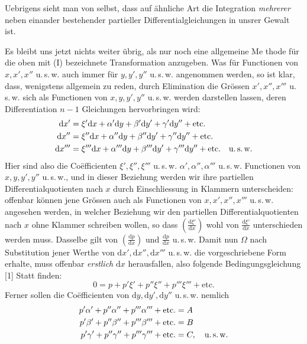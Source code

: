Uebrigens sieht man von selbst, dass auf ähnliche Art die Integration \emph{mehrerer} neben einander bestehender partieller Differentialgleichungen in unsrer Gewalt ist.

Es bleibt uns jetzt nichts weiter übrig, als nur noch eine allgemeine Me%
thode für die oben mit (I) bezeichnete Transformation anzugeben. Was für
Functionen von $x,x',x''$ u.\,s.\,w. auch immer für $y,y',y''$ u.\,s.\,w. angenommen
werden, so ist klar, dass, wenigstens allgemein zu reden, durch Elimination die
Grössen $x',x'',x'''$ u.\,s.\,w. sich als Functionen von $x,y,y',y''$ u.\,s.\,w. werden darstellen lassen, deren Differentiation $n-1$ Gleichungen hervorbringen wird:
\[
\begin{aligned}
\mathrm{d}x'&=\xi'\mathrm{d}x+\alpha'\mathrm{d}y+\beta'\mathrm{d}y'+\gamma'\mathrm{d}y''+\text{etc.}\\
\mathrm{d}x''&=\xi''\mathrm{d}x+\alpha''\mathrm{d}y+\beta''\mathrm{d}y'+\gamma''\mathrm{d}y''+\text{etc.}\\
\mathrm{d}x'''&=\xi'''\mathrm{d}x+\alpha'''\mathrm{d}y+\beta'''\mathrm{d}y'+\gamma'''\mathrm{d}y''+\text{etc.}\quad\text{u.\,s.\,w.}
\end{aligned}
\]
Hier sind also die Coëfficienten $\xi',\xi'',\xi'''$ u.\,s.\,w. $\alpha',\alpha'',\alpha'''$ u.\,s.\,w. Functionen von
$x,y,y',y''$ u.\,s.\,w., und in dieser Beziehung werden wir ihre partiellen Differentialquotienten nach $x$ durch Einschliessung in Klammern unterscheiden: offenbar können jene Grössen auch als Functionen von $x,x',x'',x'''$ u.\,s.\,w. angesehen
werden, in welcher Beziehung wir den partiellen Differentialquotienten nach $x$
ohne Klammer schreiben wollen, so dass $\left(\frac{\mathrm{d}\xi'}{\mathrm{d}x}\right)$ wohl von $\frac{\mathrm{d}\xi'}{\mathrm{d}x}$ unterschieden werden muss. Dasselbe gilt von $\left(\frac{\mathrm{d}p}{\mathrm{d}x}\right)$ und $\frac{\mathrm{d}p}{\mathrm{d}x}$ u.\,s.\,w. Damit nun $\Omega$ nach Substitution jener Werthe von $\mathrm{d}x',\mathrm{d}x'',\mathrm{d}x'''$ u.\,s.\,w. die vorgeschriebene Form erhalte,
muss offenbar \emph{erstlich} $\mathrm{d}x$ herausfallen, also folgende Bedingungsgleichung [1]
Statt finden:
\[
0=p+p'\xi'+p''\xi''+p'''\xi'''+\text{etc.}
\]
Ferner sollen die Coëfficienten von $\mathrm{d}y,\mathrm{d}y',\mathrm{d}y''$ u.\,s.\,w. nemlich
\[
\begin{aligned}
p'\alpha'+p''\alpha''+p'''\alpha'''+\text{etc.}&=A\\
p'\beta'+p''\beta''+p'''\beta'''+\text{etc.}&=B\\
p'\gamma'+p''\gamma''+p'''\gamma'''+\text{etc.}&=C,\quad\text{u.\,s.\,w.}
\end{aligned}
\]
